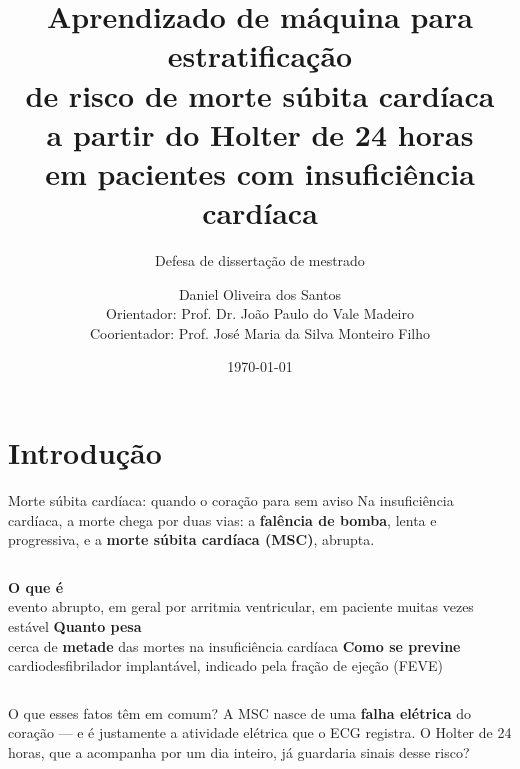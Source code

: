 \documentclass[10pt,aspectratio=169]{beamer}
\title{Aprendizado de máquina para estratificação\\
  de risco de morte súbita cardíaca\\
  a partir do Holter de 24 horas\\
  em pacientes com insuficiência cardíaca}
\subtitle{Defesa de dissertação de mestrado}
\author{Daniel Oliveira dos Santos\\[2pt]
  {\footnotesize Orientador: Prof. Dr. João Paulo do Vale Madeiro\\
   Coorientador: Prof. José Maria da Silva Monteiro Filho}}
\institute{Programa de Pós-Graduação em Ciência da Computação (MDCC)\\
  Universidade Federal do Ceará}
\date{\today}
\begin{document}
\maketitle

\section{Introdução}

\begin{frame}{Morte súbita cardíaca: quando o coração para sem aviso}
  Na insuficiência cardíaca, a morte chega por duas vias: a
  \textbf{falência de bomba}, lenta e progressiva, e a \textbf{morte súbita
  cardíaca (MSC)}, abrupta.
  \vspace{0.4em}
  \begin{columns}[T]
    \centering
    \textbf{O que é}\\[2pt]
    \small evento abrupto, em geral por arritmia ventricular, em paciente
    muitas vezes estável
    \centering
    \textbf{Quanto pesa}\\[2pt]
    \small cerca de \textbf{metade} das mortes na insuficiência cardíaca
    \cite{tomaselli2004sudden}
    \centering
    \textbf{Como se previne}\\[2pt]
    \small cardiodesfibrilador implantável, indicado pela fração de ejeção
    (FEVE) \cite{bardy2005amiodarone}
  \end{columns}
  \vspace{0.8em}
  \begin{block}{O que esses fatos têm em comum?}
    A MSC nasce de uma \textbf{falha elétrica} do coração --- e é justamente
    a atividade elétrica que o ECG registra. O Holter de 24 horas, que a
    acompanha por um dia inteiro, já guardaria sinais desse risco?
  \end{block}
\end{frame}
\end{document}
